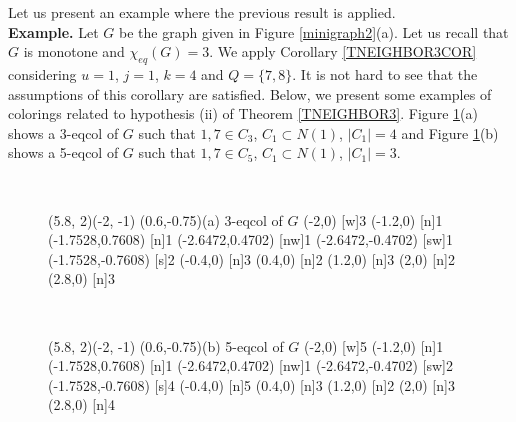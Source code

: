 Let us present an example where the previous result is applied.\\

\noindent \textbf{Example.} Let $G$ be the graph given in Figure \ref{minigraph2}(a). Let us recall that $G$ is
monotone and $\chi_{eq}(G) = 3$. We apply Corollary \ref{TNEIGHBOR3COR} considering $u = 1$, $j = 1$, $k = 4$ and
$Q = \{7,8\}$. It is not hard to see that the assumptions of this corollary are satisfied.
Below, we present some examples of colorings related to hypothesis (ii) of Theorem \ref{TNEIGHBOR3}.
Figure \ref{minigraph4}(a) shows a 3-eqcol of $G$ such that $1,7 \in C_3$, $C_1 \subset N(1)$, $|C_1| = 4$ and
Figure \ref{minigraph4}(b) shows a 5-eqcol of $G$ such that $1,7 \in C_5$, $C_1 \subset N(1)$, $|C_1| = 3$.


\begin{figure}[h]
  \centering ~~~~~~~~~~~
\begin{graph}(5.8, 2)(-2, -1)
	\freetext(0.6,-0.75){(a) 3-eqcol of $G$}
	(-2,0)
	{3}
	(-1.2,0)
	{1}
	(-1.7528,0.7608)
	{1}
	(-2.6472,0.4702)
	[nw]{1}
	(-2.6472,-0.4702)
	[sw]{1}
	(-1.7528,-0.7608)
	{2}
	(-0.4,0)
	{3}
	(0.4,0)
	{2}
	(1.2,0)
	{3}
	(2,0)
	{2}
	(2.8,0)
	{3}
\end{graph}~~~~~~~
\begin{graph}(5.8, 2)(-2, -1)
	\freetext(0.6,-0.75){(b) 5-eqcol of $G$}
	(-2,0)
	{5}
	(-1.2,0)
	{1}
	(-1.7528,0.7608)
	{1}
	(-2.6472,0.4702)
	[nw]{1}
	(-2.6472,-0.4702)
	[sw]{2}
	(-1.7528,-0.7608)
	{4}
	(-0.4,0)
	{5}
	(0.4,0)
	{3}
	(1.2,0)
	{2}
	(2,0)
	{3}
	(2.8,0)
	{4}
\end{graph}
\caption{}
  \label{minigraph4}
\end{figure}

